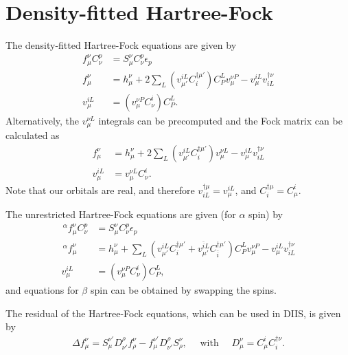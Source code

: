 \documentclass[a4paper,12pt,oneside]{book}
\newcommand{\spa}[1]{{#1}}
\newcommand{\spb}[1]{\bar{#1}}
\newcommand{\pre}[1]{\,#1\!}
\begin{document}
\section{Density-fitted Hartree-Fock}
The density-fitted Hartree-Fock equations are given by
\begin{equation}
\begin{aligned}
f_\mu^\nu C_\nu^p &= S_\mu^\nu C_\nu^p \epsilon_p\\
f_\mu^\nu &= h_\mu^\nu + 2\sum_L\left(v_{\mu'}^{iL} C^{\dagger\mu'}_i\right) C_{P}^{L} v_{\mu}^{\nu P}
- v_{\mu}^{iL} v^{\dagger\nu}_{iL}\\
v_{\mu}^{iL} &= \left(v_{\mu}^{\nu P} C_{\nu}^i\right) C_P^L.
\end{aligned}
\end{equation}
Alternatively, the $v_{\mu}^{\nu L}$ integrals can be precomputed and the Fock matrix can be calculated as
\begin{equation}
\begin{aligned}
f_\mu^\nu &= h_\mu^\nu + 2\sum_L\left(v_{\mu'}^{iL} C^{\dagger\mu'}_i\right) v_{\mu}^{\nu L}
- v_{\mu}^{iL} v^{\dagger\nu}_{iL}\\
v_{\mu}^{iL} &= v_{\mu}^{\nu L} C_{\nu}^i.
\end{aligned}
\end{equation}
Note that our orbitals are real, and therefore $v^{\dagger\mu}_{iL} = v_{\mu}^{iL}$, 
and $C^{\dagger\mu}_i = C_{\mu}^i$.

The unrestricted Hartree-Fock equations are given (for $\alpha$ spin) by
\begin{equation}
\begin{aligned}
\pre{^\alpha}f_{\mu}^{\nu} C_{\nu}^{\spa p} &= S_{\mu}^{\nu} C_{\nu}^{\spa p} \epsilon_{\spa p}\\
\pre{^\alpha}f_{\mu}^{\nu} &= h_{\mu}^{\nu} + \sum_L\left(v_{\mu'}^{\spa i L} C^{\dagger\mu'}_{\spa i}
+v_{\mu'}^{\spb i L} C^{\dagger\mu'}_{\spb i}\right) C_{P}^{L} v_{\mu}^{\nu P}
- v_{\mu}^{\spa i L} v^{\dagger\nu}_{\spa i L}\\
v_{\mu}^{\spa i L} &= \left(v_{\mu}^{\nu P} C_{\nu}^{\spa i}\right) C_{P}^L,
\end{aligned}
\end{equation}
and equations for $\beta$ spin can be obtained by swapping the spins.

The residual of the Hartree-Fock equations, which can be used in DIIS, is given by 
\begin{equation}
\begin{aligned}
  \label{eq:hf-residual}
  \Delta f_{\mu}^{\nu} = S_{\mu}^{\nu'} D_{\nu'}^{\rho}f_{\rho}^{\nu} - f_{\mu}^{\nu'} D_{\nu'}^{\rho}S_{\rho}^{\nu},
  \quad \mbox{ with } \quad D_{\mu}^{\nu} = C_{\mu}^i C_i^{\dagger\nu}.
\end{aligned}
\end{equation}
\end{document}
